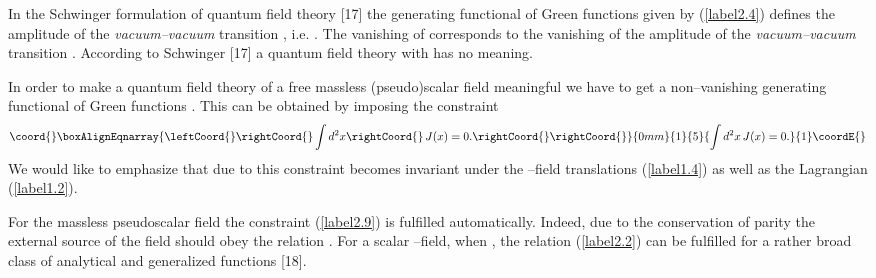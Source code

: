 \documentclass[a4paper,12pt] {article}
\begin{document}
In the Schwinger formulation of quantum field theory [17] the
generating functional of Green functions \coordHE{} given by
(\ref{label2.4}) defines the amplitude of the {\it vacuum--vacuum}
transition \coordHE{}, i.e. \coordHE{}. The vanishing of \coordHE{} corresponds to the
vanishing of the amplitude of the {\it vacuum--vacuum} transition
\coordHE{}. According to Schwinger [17] a quantum
field theory with \coordHE{} has no meaning.

In order to make a quantum field theory of a free massless
(pseudo)scalar field \coordHE{} meaningful we have to get a
non--vanishing generating functional of Green functions \coordHE{}. This
can be obtained by imposing the constraint
%
\begin{eqnarray}\coord{}\boxAlignEqnarray{\leftCoord{}\rightCoord{}\label{label2.9}
\int d^2x\rightCoord{}\,J(x) = 0. \rightCoord{}
\rightCoord{}}{0mm}{1}{5}{\int d^2x\,J(x) = 0. 
}{1}\coordE{}\end{eqnarray}
%
We would like to emphasize that due to this constraint \coordHE{} becomes
invariant under the \myHighlight{$\vartheta$}\coordHE{}--field translations (\ref{label1.4})
as well as the Lagrangian (\ref{label1.2}).

For the massless pseudoscalar field \coordHE{} the constraint
(\ref{label2.9}) is fulfilled automatically. Indeed, due to the
conservation of parity the external source of the field \coordHE{}
should obey the relation \coordHE{}. For a scalar
\myHighlight{$\vartheta$}\coordHE{}--field, when \coordHE{}, the relation
(\ref{label2.2}) can be fulfilled for a rather broad class of
analytical and generalized functions [18].
\end{document}
